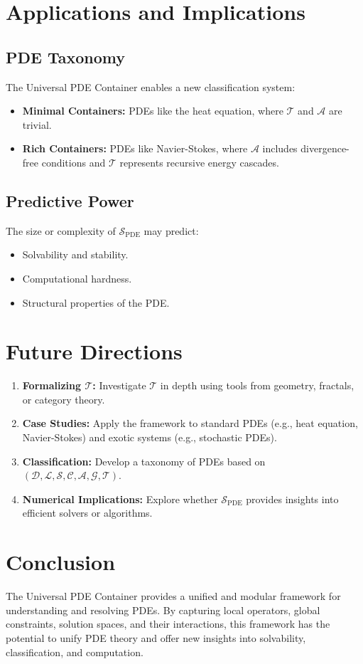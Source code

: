 \section{Applications and Implications}
\subsection{PDE Taxonomy}
The Universal PDE Container enables a new classification system:
\begin{itemize}
    \item \textbf{Minimal Containers:} PDEs like the heat equation, where \(\mathcal{T}\) and \(\mathcal{A}\) are trivial.
    \item \textbf{Rich Containers:} PDEs like Navier-Stokes, where \(\mathcal{A}\) includes divergence-free conditions and \(\mathcal{T}\) represents recursive energy cascades.
\end{itemize}

\subsection{Predictive Power}
The size or complexity of \(\mathcal{S}_{\text{PDE}}\) may predict:
\begin{itemize}
    \item Solvability and stability.
    \item Computational hardness.
    \item Structural properties of the PDE.
\end{itemize}

\section{Future Directions}
\begin{enumerate}
    \item \textbf{Formalizing \(\mathcal{T}\):} Investigate \(\mathcal{T}\) in depth using tools from geometry, fractals, or category theory.
    \item \textbf{Case Studies:} Apply the framework to standard PDEs (e.g., heat equation, Navier-Stokes) and exotic systems (e.g., stochastic PDEs).
    \item \textbf{Classification:} Develop a taxonomy of PDEs based on \((\mathcal{D}, \mathcal{L}, \mathcal{S}, \mathcal{C}, \mathcal{A}, \mathcal{G}, \mathcal{T})\).
    \item \textbf{Numerical Implications:} Explore whether \(\mathcal{S}_{\text{PDE}}\) provides insights into efficient solvers or algorithms.
\end{enumerate}

\section{Conclusion}
The Universal PDE Container provides a unified and modular framework for understanding and resolving PDEs. By capturing local operators, global constraints, solution spaces, and their interactions, this framework has the potential to unify PDE theory and offer new insights into solvability, classification, and computation.

